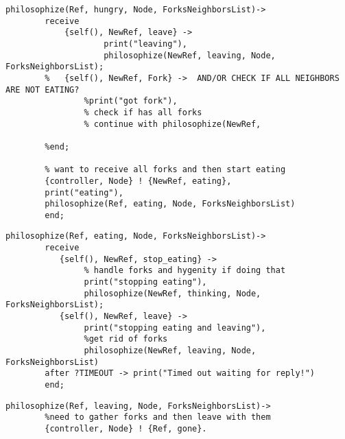 \documentclass[11pt]{article}
\begin{document}
\begin{lstlisting}
philosophize(Ref, hungry, Node, ForksNeighborsList)->
        receive
            {self(), NewRef, leave} ->
                    print("leaving"),
                    philosophize(NewRef, leaving, Node, ForksNeighborsList);
        %   {self(), NewRef, Fork} ->  AND/OR CHECK IF ALL NEIGHBORS ARE NOT EATING?
                %print("got fork"),
                % check if has all forks
                % continue with philosophize(NewRef, 

        %end;

        % want to receive all forks and then start eating
        {controller, Node} ! {NewRef, eating},
        print("eating"),
        philosophize(Ref, eating, Node, ForksNeighborsList)
        end;
\end{lstlisting}
\begin{lstlisting}
philosophize(Ref, eating, Node, ForksNeighborsList)->
        receive
           {self(), NewRef, stop_eating} ->
                % handle forks and hygenity if doing that
                print("stopping eating"),
                philosophize(NewRef, thinking, Node, ForksNeighborsList);
           {self(), NewRef, leave} ->
                print("stopping eating and leaving"),
                %get rid of forks
                philosophize(NewRef, leaving, Node, ForksNeighborsList)
        after ?TIMEOUT -> print("Timed out waiting for reply!")
        end;
\end{lstlisting}

\begin{lstlisting}
philosophize(Ref, leaving, Node, ForksNeighborsList)->
        %need to gather forks and then leave with them
        {controller, Node} ! {Ref, gone}.
\end{lstlisting}
\end{document}
